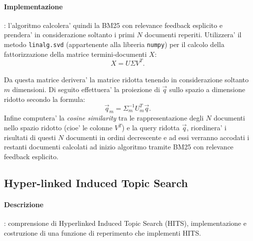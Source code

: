 \paragraph{\textbf{Implementazione}}: l'algoritmo calcolera' quindi la BM25 con relevance feedback esplicito e prendera' in considerazione soltanto i primi $N$ documenti reperiti. Utilizzera' il metodo \texttt{linalg.svd} (appartenente alla libreria \texttt{numpy}) per il calcolo della fattorizzazione della matrice termini-documenti $X$: 
\[ X = U \Sigma V^{T}. \]\\
Da questa matrice derivera' la matrice ridotta tenendo in considerazione soltanto $m$ dimensioni. Di seguito effettuera' la proiezione di $\vec{q}$ sullo spazio a dimensione ridotto secondo la formula: 
\[ \vec{q}_m = \Sigma^{-1}_m U^{T}_m \vec{q}. \]
Infine computera' la \textit{cosine similarity} tra le rappresentazione degli $N$ documenti nello spazio ridotto (cioe' le colonne $V^{T}$) e la query ridotta $\vec{q}$, riordinera' i risultati di questi $N$ documenti in ordini decrescente e ad essi verranno accodati i restanti documenti calcolati ad inizio algoritmo tramite BM25 con relevance feedback esplicito.


\subsection{Hyper-linked Induced Topic Search}
\label{sec:hits}

\paragraph{\textbf{Descrizione}}: comprensione di Hyperlinked Induced Topic Search (HITS), implementazione e costruzione di una funzione di reperimento che implementi HITS.

